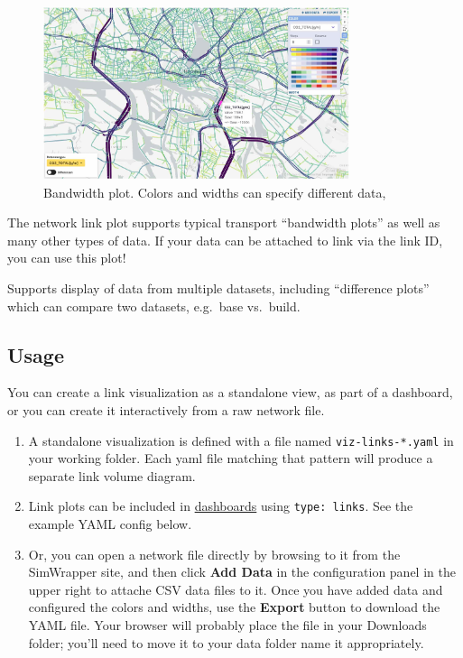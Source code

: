 \begin{figure}[H]
  \centering
  \includegraphics[width=0.8\textwidth]{assets/links.jpg}
  \caption{Bandwidth plot. Colors and widths can specify different data,}
\end{figure}

The network link plot supports typical transport ``bandwidth plots'' as
well as many other types of data. If your data can be attached to link
via the link ID, you can use this plot!

Supports display of data from multiple datasets, including ``difference
plots'' which can compare two datasets, e.g.~base vs.~build.

\hypertarget{usage}{%
\subsection{Usage}}

You can create a link visualization as a standalone view, as part of a
dashboard, or you can create it interactively from a raw network file.

\begin{enumerate}
\def\labelenumi{\arabic{enumi}.}
\item
  A standalone visualization is defined with a file named
  \texttt{viz-links-*.yaml} in your working folder. Each yaml file
  matching that pattern will produce a separate link volume diagram.
\item
  Link plots can be included in \url{dashboards} using
  \texttt{type:\ links}. See the example YAML config below.
\item
  Or, you can open a network file directly by browsing to it from the
  SimWrapper site, and then click \textbf{Add Data} in the configuration
  panel in the upper right to attache CSV data files to it. Once you
  have added data and configured the colors and widths, use the
  \textbf{Export} button to download the YAML file. Your browser will
  probably place the file in your Downloads folder; you'll need to move
  it to your data folder name it appropriately.
\end{enumerate}

